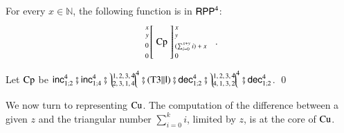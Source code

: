 \begin{theorem}%
\label{theorem:CP in RPP}
For every $x\in\mathbb{N}$, the following function is in $\mathsf{RPP}^4$:
\begin{align*}
\arraycolsep=1.4pt
\begin{array}{rcl}
 \left. {\scriptsize \begin{array}{r} x\\ y\\[1mm] 0\\[1mm] 0  \end{array}} \right[
 & \CP &
 \left] {\scriptsize \begin{array}{l}
                       x\\ y\\[1mm]  (\sum^{x+y}_{i=0} i ) + x\\[0.75mm] 0
                     \end{array} } \right.
\end{array}
\enspace .
\end{align*}
\end{theorem}
\begin{prf}
Let $\operatorname{Cp}$ be 
$\rprInc^{4}_{1;2} \rprSeq\rprInc^{4}_{1;4} \rprSeq \rprSwap{4}{1,2,3,4}{2,3,1,4} 
  \rprSeq (\rprPCom{\operatorname{T3}}{\rprId}) \rprSeq \rprDec^4_{1;2} \rprSeq 
  \rprSwap{4}{1,2,3,4}{4,1,3,2} \rprSeq \rprDec^4_{1;2}$.
\qed
\end{prf}

We now turn to representing $ \operatorname{Cu} $. The computation of the difference between a given $ z $ and the triangular number
	$ \sum_{i=0}^{k} i $, limited by $ z $, is at the core of $ \operatorname{Cu} $.

